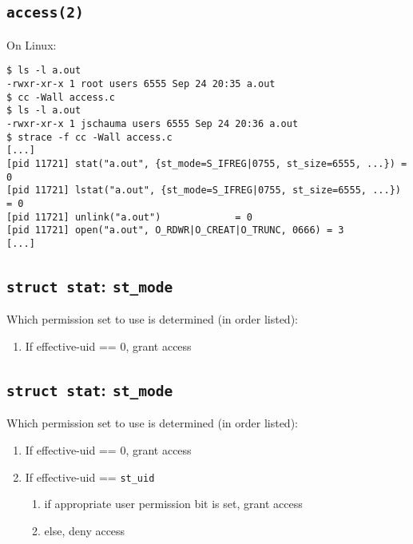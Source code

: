 \documentclass[xga]{xdvislides}
\begin{document}
\subsection{{\tt access(2)}}
On Linux:
\begin{verbatim}
$ ls -l a.out
-rwxr-xr-x 1 root users 6555 Sep 24 20:35 a.out
$ cc -Wall access.c
$ ls -l a.out
-rwxr-xr-x 1 jschauma users 6555 Sep 24 20:36 a.out
$ strace -f cc -Wall access.c
[...]
[pid 11721] stat("a.out", {st_mode=S_IFREG|0755, st_size=6555, ...}) = 0
[pid 11721] lstat("a.out", {st_mode=S_IFREG|0755, st_size=6555, ...}) = 0
[pid 11721] unlink("a.out")             = 0
[pid 11721] open("a.out", O_RDWR|O_CREAT|O_TRUNC, 0666) = 3
[...]
\end{verbatim}


\subsection{{\tt struct stat}: {\tt st\_mode}}
Which permission set to use is determined (in order listed):
\begin{enumerate}
	\item If effective-uid == 0, grant access
\end{enumerate}

\subsection{{\tt struct stat}: {\tt st\_mode}}
Which permission set to use is determined (in order listed):
\begin{enumerate}
	\item If effective-uid == 0, grant access
	\item If effective-uid == {\tt st\_uid}
		\begin{enumerate}
			\item if appropriate user permission bit is set, grant access
			\item else, deny access
		\end{enumerate}
\end{enumerate}
\end{document}

